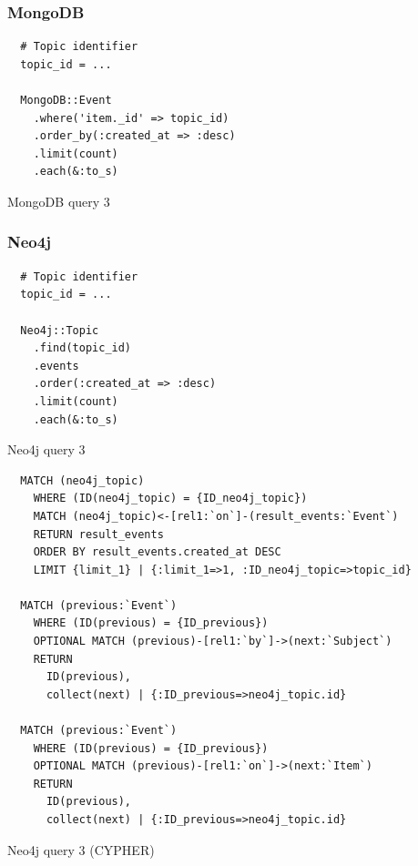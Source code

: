 \subsubsection*{MongoDB}

\begin{listing}[H]
  \begin{verbatim}
  # Topic identifier
  topic_id = ...

  MongoDB::Event
    .where('item._id' => topic_id)
    .order_by(:created_at => :desc)
    .limit(count)
    .each(&:to_s)
  \end{verbatim}

  \caption{MongoDB query 3}
  \label{lst:mongodb-query-3}
\end{listing}

\subsubsection*{Neo4j}

\begin{listing}[H]
  \begin{verbatim}
  # Topic identifier
  topic_id = ...

  Neo4j::Topic
    .find(topic_id)
    .events
    .order(:created_at => :desc)
    .limit(count)
    .each(&:to_s)
  \end{verbatim}


  \caption{Neo4j query 3}
  \label{lst:neo4j-query-3}
\end{listing}

\begin{listing}[H]
  \begin{verbatim}
  MATCH (neo4j_topic)
    WHERE (ID(neo4j_topic) = {ID_neo4j_topic})
    MATCH (neo4j_topic)<-[rel1:`on`]-(result_events:`Event`)
    RETURN result_events
    ORDER BY result_events.created_at DESC
    LIMIT {limit_1} | {:limit_1=>1, :ID_neo4j_topic=>topic_id}

  MATCH (previous:`Event`)
    WHERE (ID(previous) = {ID_previous})
    OPTIONAL MATCH (previous)-[rel1:`by`]->(next:`Subject`)
    RETURN
      ID(previous),
      collect(next) | {:ID_previous=>neo4j_topic.id}

  MATCH (previous:`Event`)
    WHERE (ID(previous) = {ID_previous})
    OPTIONAL MATCH (previous)-[rel1:`on`]->(next:`Item`)
    RETURN
      ID(previous),
      collect(next) | {:ID_previous=>neo4j_topic.id}
  \end{verbatim}

  \caption{Neo4j query 3 (CYPHER)}
  \label{lst:neo4j-query-3 (CYPHER)}
\end{listing}

